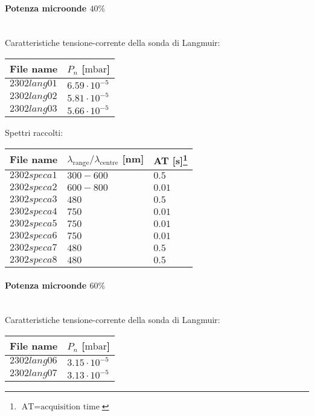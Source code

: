 \paragraph*{Potenza microonde $\text{40\%}$} ~\\
Caratteristiche tensione-corrente della sonda di Langmuir:
\begin{center}
  \begin{tabular}{p{3cm}p{3cm}}
  \toprule
File name	&$P_{n}$ [$\si{\milli\bar}$]\\
  \midrule
$2302lang01$	&$6.59\cdot10^{-5}$\\
$2302lang02$	&$5.81\cdot10^{-5}$\\
$2302lang03$	&$5.66\cdot10^{-5}$\\
  \bottomrule
  \end{tabular}
\end{center}

Spettri raccolti:
\begin{center}
\begin{tabular}{p{3cm}p{3.5cm}p{3.5cm}}
\toprule
File name	&$\lambda_\text{range}\text{/}\lambda_\text{centre}$ [nm] &AT [s]\footnote{$\text{AT}=\text{acquisition time}$}\\
\midrule
$2302speca1$	&$300-600$	&$0.5$\\
$2302speca2$	&$600-800$	&$0.01$\\
$2302speca3$	&$480$		&$0.5$\\
$2302speca4$	&$750$		&$0.01$\\
$2302speca5$	&$750$		&$0.01$\\
$2302speca6$	&$750$		&$0.01$\\
$2302speca7$	&$480$		&$0.5$\\
$2302speca8$	&$480$		&$0.5$\\
\bottomrule
\end{tabular}
\end{center}

\paragraph*{Potenza microonde $\text{60\%}$} ~\\
Caratteristiche tensione-corrente della sonda di Langmuir:
\begin{center}
\begin{tabular}{p{3cm}p{3cm}}
\toprule
File name	&$P_n$ [$\si{\milli\bar}$]\\
\midrule
$2302lang06$	&$3.15\cdot10^{-5}$\\
$2302lang07$	&$3.13\cdot10^{-5}$\\
\bottomrule
\end{tabular}
\end{center}

